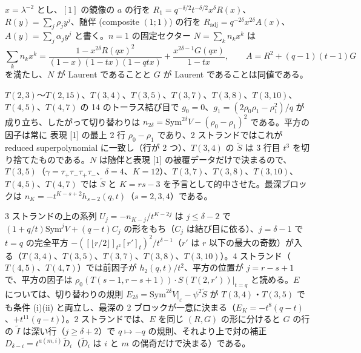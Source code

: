\begin{proposition}\label{prop:rows}
$x = \lambda^{-2}$ とし、$[1]$ の鏡像の $a$ の行を $R_1 = q^{-\delta/2}t^{-\delta/2}x^\delta R(x)$、$R(y) = \sum_j \rho_j y^j$、随伴 (composite $(1;1)$) の行を $R_{\mathrm{adj}} = q^{-2\delta}x^{2\delta}A(x)$、$A(y) = \sum_j \alpha_j y^j$ と書く。$n = 1$ の固定セクター $N = \sum_k n_k x^k$ は
\[
\sum_k n_k x^k = \frac{1 - x^{2\delta}R(qx)^2}{(1-x)(1-tx)(1-qtx)} + \frac{x^{2\delta-1}G(qx)}{1-tx},\qquad A = R^2 + (q-1)(t-1)G
\]
を満たし、$N$ が Laurent であることと $G$ が Laurent であることは同値である。
\end{proposition}
\begin{compresult}\label{cr:rows}
$T(2,3)$〜$T(2,15)$、$T(3,4)$、$T(3,5)$、$T(3,7)$、$T(3,8)$、$T(3,10)$、$T(4,5)$、$T(4,7)$ の 14 のトーラス結び目で $g_0 = 0$、$g_1 = (2\rho_0\rho_1 - \rho_1^2)/q$ が成り立ち、したがって切り替わりは $n_{2\delta} = \mathrm{Sym}^{2\delta}V - (\rho_0 - \rho_1)^2$ である。平方の因子は常に 表現 [1] の最上 2 行 $\rho_0 - \rho_1$ であり、2 ストランドではこれがreduced superpolynomial に一致し（行が 2 つ）、$T(3,4)$ の $\tilde S$ は 3 行目 $t^3$ を切り捨てたものである。$N$ は随伴と表現 [1] の被覆データだけで決まるので、$T(3,5)$（$\gamma = \tau_+\tau_-\tau_+\tau_-$、$\delta = 4$、$K = 12$）、$T(3,7)$、$T(3,8)$、$T(3,10)$、$T(4,5)$、$T(4,7)$ では $\tilde S$ と $K = rs - 3$ を予言として的中させた。最深ブロックは $n_K = -t^{K-s+2}h_{s-2}(q,t)$（$s = 2, 3, 4$）である。
\end{compresult}
\begin{compresult}\label{cr:threestrand}
3 ストランドの上の系列 $U_j = -n_{K-j}/t^{K-2j}$ は $j \le \delta - 2$ で $(1 + q/t)\mathrm{Sym}^jV + (q-t)C_j$ の形をもち（$C_j$ は結び目に依る）、$j = \delta - 1$ で $t = q$ の完全平方 $-([\lfloor r/2\rfloor]_{t^2}[r']_t)^2/t^{\delta-1}$（$r'$ は $r$ 以下の最大の奇数）が入る（$T(3,4)$、$T(3,5)$、$T(3,7)$、$T(3,8)$、$T(3,10)$）。4 ストランド（$T(4,5)$、$T(4,7)$）では前因子が $h_2(q,t)/t^2$、平方の位置が $j = r - s + 1$ で、平方の因子は $\rho_0(T(s-1, r-s+1))\cdot S(T(2,r'))|_{t=q}$ と読める。$E$ については、切り替わりの規則 $E_{2\delta} = \mathrm{Sym}^{2\delta}V|_{\varepsilon} - \psi^2\tilde S$ が $T(3,4)$・$T(3,5)$ でも条件 (i)(ii) と両立し、最深の 2 ブロックが一意に決まる（$E_K = -t^8(q-t)$、$+t^{11}(q-t)$）。2 ストランドでは、$E$ を同じ $(R, G)$ の形に分けると $G$ の行の $\tilde I$ は深い行（$j \ge \delta + 2$）で $q \mapsto -q$ の規則、それより上で対の補正 $D_{\delta-i} = t^{a(m,i)}\tilde D_i$（$\tilde D_i$ は $i$ と $m$ の偶奇だけで決まる）である。
\end{compresult}
